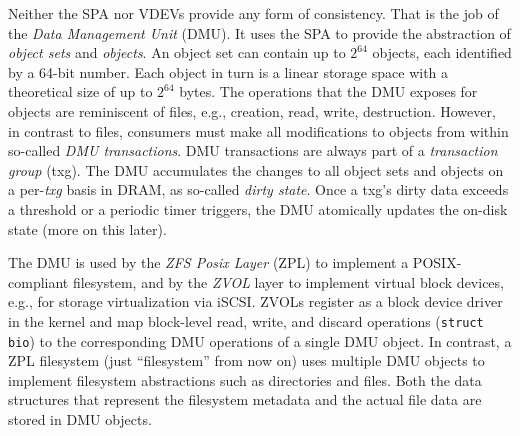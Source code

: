 \documentclass[12pt,a4paper,twoside]{book}
\begin{document}
Neither the SPA nor VDEVs provide any form of consistency.
That is the job of the \textit{Data Management Unit} (DMU).
It uses the SPA to provide the abstraction of \textit{object sets} and \textit{objects}.
An object set can contain up to $2^{64}$ objects, each identified by a 64-bit number.
Each object in turn is a linear storage space with a theoretical size of up to $2^{64}$ bytes.
The operations that the DMU exposes for objects are reminiscent of files, e.g., creation, read, write, destruction.
However, in contrast to files, consumers must make all modifications to objects from within so-called \textit{DMU transactions}.
DMU transactions are always part of a \textit{transaction group} (txg).
The DMU accumulates the changes to all object sets and objects on a per-\textit{txg} basis in DRAM, as so-called \textit{dirty state}.
Once a txg's dirty data exceeds a threshold or a periodic timer triggers, the DMU atomically updates the on-disk state (more on this later).

The DMU is used by the \textit{ZFS Posix Layer} (ZPL) to implement a POSIX-compliant filesystem, and by the \textit{ZVOL} layer to implement virtual block devices, e.g., for storage virtualization via iSCSI.
ZVOLs register as a block device driver in the kernel and map block-level read, write, and discard operations (\lstinline[style=figurepseudocode]{struct bio}) to the corresponding DMU operations of a single DMU object.
In contrast, a ZPL filesystem (just ``filesystem'' from now on) uses multiple DMU objects to implement filesystem abstractions such as directories and files.
Both the data structures that represent the filesystem metadata and the actual file data are stored in DMU objects.
\end{document}
